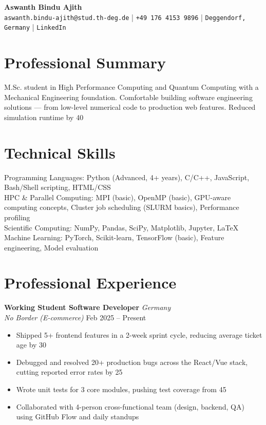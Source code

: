 \documentclass[11pt,a4paper]{article}
\newcommand{\entryheader}[4]{%
    \textbf{#1} \hfill \textit{#2}\\
    \textit{#3} \hfill #4
}
\begin{document}
\begin{center}
    {\LARGE\bfseries Aswanth Bindu Ajith}\\[4pt]
    \texttt{aswanth.bindu-ajith@stud.th-deg.de} | \texttt{+49 176 4153 9896} | \texttt{Deggendorf, Germany} | \texttt{LinkedIn}
\end{center}

\section{Professional Summary}
M.Sc. student in High Performance Computing and Quantum Computing with a Mechanical Engineering foundation. Comfortable building software engineering solutions — from low-level numerical code to production web features. Reduced simulation runtime by 40%

\section{Technical Skills}

Programming Languages: Python (Advanced, 4+ years), C/C++, JavaScript, Bash/Shell scripting, HTML/CSS\\

HPC & Parallel Computing: MPI (basic), OpenMP (basic), GPU-aware computing concepts, Cluster job scheduling (SLURM basics), Performance profiling\\

Scientific Computing: NumPy, Pandas, SciPy, Matplotlib, Jupyter, LaTeX\\

Machine Learning: PyTorch, Scikit-learn, TensorFlow (basic), Feature engineering, Model evaluation


\section{Professional Experience}

\entryheader{ Working Student Software Developer }{ Germany }{ No Border (E-commerce) }{ Feb 2025 – Present }
\begin{itemize}[leftmargin=*,nosep,topsep=2pt]
    
    \item Shipped 5+ frontend features in a 2-week sprint cycle, reducing average ticket age by 30%
    
    \item Debugged and resolved 20+ production bugs across the React/Vue stack, cutting reported error rates by 25%
    
    \item Wrote unit tests for 3 core modules, pushing test coverage from 45%
    
    \item Collaborated with 4-person cross-functional team (design, backend, QA) using GitHub Flow and daily standups
    
\end{itemize}
\end{document}
